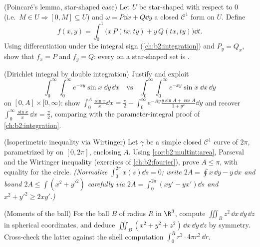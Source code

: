 \begin{exercise}[$\star\star\star$]\label{exo:b2:multint:8}
(Poincaré's lemma, star-shaped case) Let $U$ be star-shaped with
respect to $0$ (i.e.\ $M \in U \Rightarrow [0, M] \subseteq U$)
and $\omega = P\dd x + Q\dd y$ a closed $\mathcal{C}^1$ form on
$U$. Define
\[
f(x, y) = \int_0^1 \bigl(x\,P(tx, ty) + y\,Q(tx, ty)\bigr)\dd t .
\]
Using differentiation under the integral sign
(\cref{ch:b2:integration}) and $P_y = Q_x$, show that $f_x = P$
and $f_y = Q$: every  on a star-shaped  set is
.
\end{exercise}

\begin{exercise}[$\star\star\star$]\label{exo:b2:multint:9}
(Dirichlet integral by double integration) Justify and exploit
\[
\int_0^\infty\!\!\int_0^\infty e^{-xy}\sin x\;\dd y\,\dd x
\quad\text{vs}\quad
\int_0^\infty\!\!\int_0^\infty e^{-xy}\sin x\;\dd x\,\dd y
\]
on $[0, A] \times [0, \infty)$: show $\int_0^A \frac{\sin
x}{x}\dd x = \frac\pi2 - \int_0^\infty
e^{-Ay}\frac{y\sin A + \cos A}{1 + y^2}\dd y$ and recover
$\int_0^\infty \frac{\sin x}{x}\,\dd x = \frac\pi2$, comparing
with the parameter-integral proof of
\cref{ch:b2:integration}.
\end{exercise}

\begin{exercise}[$\star\star\star$]\label{exo:b2:multint:10}
(Isoperimetric inequality via Wirtinger) Let $\gamma$ be a simple
closed $\mathcal{C}^1$ curve of  $2\pi$, parametrized by  on $[0, 2\pi]$, enclosing  $A$. Using
\cref{cor:b2:multint:area}, Parseval and the Wirtinger inequality
(exercises of \cref{ch:b2:fourier}), prove $A \leq \pi$, with
equality for the circle. \emph{(Normalize $\int_0^{2\pi} x(s)\dd s
= 0$; write $2A = \oint x\,\dd y - y\,\dd x$ and bound $2A \leq
\int (x^2 + y'^2)$ carefully via $2A = \int_0^{2\pi}(xy' - yx')\dd
s$ and $x^2 + y'^2 \geq 2xy'$.)}
\end{exercise}

\begin{exercise}[$\star\star$]\label{exo:b2:multint:11}
(Moments of the ball) For the ball $B$ of radius $R$ in
$\R^3$, compute $\iiint_B z^2\,\dd x\,\dd y\,\dd z$ in
spherical coordinates, and deduce $\iiint_B (x^2 + y^2 +
z^2)\,\dd x\,\dd y\,\dd z$ by symmetry. Cross-check the
latter against the shell computation $\int_0^R r^2\cdot4\pi
r^2\,\dd r$.
\end{exercise}

